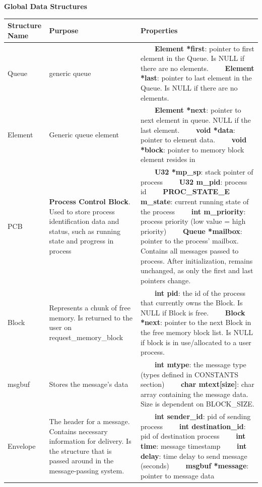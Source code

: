 \documentclass[11pt, oneside]{article}
\newcommand{\tabitem}{~~\llap{\textbullet}~~}
\begin{document}
\clearpage
{\bf Global Data Structures}
\begin{longtable}{|L{2cm}|L{5cm}|L{8cm}|} \hline
\textbf{Structure Name} & \textbf{Purpose} & \textbf{Properties} \\ \hline
Queue& generic queue &
\tabitem \textbf{Element *first}: pointer to first element in the Queue. Is NULL if there are no elements.
\newline
\tabitem \textbf{Element *last}: pointer to last element in the Queue. Is NULL if there are no elements.\\ \hline
Element & Generic queue element &
\tabitem \textbf{Element *next}: pointer to next element in queue. NULL if the last element.
\newline
\tabitem \textbf{void *data}: pointer to element data.
\newline
\tabitem \textbf{void *block}: pointer to memory block element resides in \\ \hline
PCB & \textbf{Process Control Block}. Used to store process identification data and status, such as running state and progress in process& \tabitem \textbf{U32 *mp\_sp}: stack pointer of process \newline
\tabitem \textbf{U32 m\_pid}: process id \newline
\tabitem \textbf{PROC\_STATE\_E m\_state}: current running state of the process \newline
\tabitem \textbf{int m\_priority}: process priority (low value = high priority) \newline
\tabitem \textbf{Queue *mailbox}: pointer to the process' mailbox. Contains all messages passed to process. After initialization, remains unchanged, as only the first and last pointers change.\\ \hline
Block & Represents a chunk of free memory. Is returned to the user on request\_memory\_block &
\tabitem \textbf{int pid}: the id of the process that currently owns the Block. Is NULL if Block is free. \newline
\tabitem \textbf{Block *next}: pointer to the next Block in the free memory block list. Is NULL if block is in use/allocated to a user process. \\ \hline
msgbuf&Stores the message's data&
\tabitem \textbf{int mtype}: the message type (types defined in CONSTANTS section) \newline
\tabitem \textbf{char mtext[size]}: char array containing the message data. Size is dependent on BLOCK\_SIZE.\\ \hline
Envelope&The header for a message. Contains necessary information for delivery. Is the structure that is passed around in the message-passing system.&
\tabitem \textbf{int sender\_id}: pid of sending process \newline
\tabitem \textbf{int destination\_id}: pid of destination process \newline
\tabitem \textbf{int time}: message timestamp \newline
\tabitem \textbf{int delay}: time delay to send message (seconds) \newline
\tabitem \textbf{msgbuf *message}: pointer to message data \newline
\\ \hline


\end{longtable}
\end{document}
